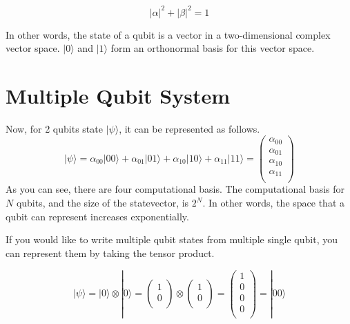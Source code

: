 \begin{equation}
    |\alpha|^2 + |\beta|^2 = 1
\end{equation}

In other words, the state of a qubit is a vector in a two-dimensional complex vector space.
$|0\rangle$ and $|1\rangle$ form an orthonormal basis for this vector space\cite{nielsen}.

\section{Multiple Qubit System}
Now, for 2 qubits state $|\psi\rangle$, it can be represented as follows.
\begin{equation}
    |\psi\rangle = \alpha_{00} |00\rangle + \alpha_{01} |01\rangle + \alpha_{10} |10\rangle + \alpha_{11} |11\rangle =
    \begin{pmatrix}
        \alpha_{00} \\
        \alpha_{01} \\
        \alpha_{10} \\
        \alpha_{11} \\
    \end{pmatrix}
\end{equation}
As you can see, there are four computational basis.
The computational basis for $N$ qubits, and the size of the statevector, is $2^N$.
In other words, the space that a qubit can represent increases exponentially.

If you would like to write multiple qubit states from multiple single qubit, you can represent them by taking the tensor product.

\begin{equation}
    |\psi\rangle = |0\rangle \otimes |0\rangle = 
    \begin{pmatrix}
        1 \\
        0 \\
    \end{pmatrix} \otimes
    \begin{pmatrix}
        1 \\
        0 \\
    \end{pmatrix} =
    \begin{pmatrix}
        1 \\
        0 \\
        0 \\
        0 \\
    \end{pmatrix} = |00\rangle
\end{equation}


